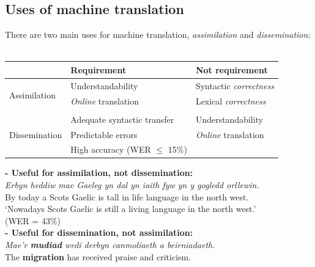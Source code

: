\documentclass[a4paper,english,12pt]{article}
\begin{document}
\begin{spacing}{1.0}
 
\subsection{Uses of machine translation}


There are two main uses for machine translation, \emph{assimilation} and \emph{dissemination}:\\
~\\
\begin{table}
\begin{tabular}{l|l|l}
~  & Requirement & Not requirement\\
\hline
\multirow{3}{*}{Assimilation} & Understandability         & Syntactic \emph{correctness}\\
                              & \emph{Online} translation & Lexical \emph{correctness}\\
                              &                  & \\
\hline
\multirow{3}{*}{Dissemination} & Adequate syntactic transfer & Understandability \\
                               &  Predictable errors   & \emph{Online} translation \\
                               &  High accuracy (WER $\le$ 15\%)    & \\
\hline
\end{tabular}
\end{table}



\textbf{- Useful for assimilation, not dissemination:}\\


\emph{Erbyn heddiw mae Gaeleg yn dal yn iaith fyw yn y gogledd orllewin. }\\


By today a Scots Gaelic is tall in life language in the north west.\\


`Nowadays Scots Gaelic is still a living language in the north west.'\\ (WER = 43\%)\\

\textbf{- Useful for dissemination, not assimilation:}\\

\emph{Mae'r \textbf{mudiad} wedi derbyn canmoliaeth a beirniadaeth.}\\


The \textbf{migration} has received praise and criticism.\\


\end{spacing}
\end{document}
